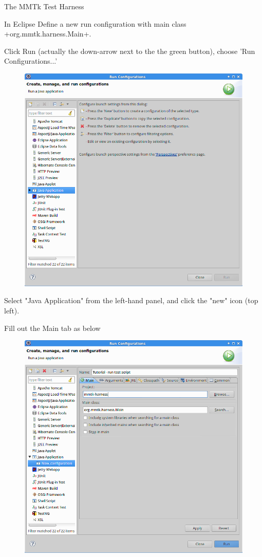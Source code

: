 \begin{chapter}{The MMTk Test Harness}
\begin{section}{In Eclipse}
Define a new run configuration with main class \spverb+org.mmtk.harness.Main+.

Click Run (actually the down-arrow next to the the green button), choose 'Run Configurations...' 
\begin{figure}[H]
  \centering
  \includegraphics[width=\textwidth]{images/TheMMTkTestHarness-RunConfigurations.png}
\end{figure}

Select "Java Application" from the left-hand panel, and click the "new" icon (top left).

Fill out the Main tab as below

\begin{figure}[H]
  \centering
  \includegraphics[width=\textwidth]{images/TheMMTkTestHarness-MainTab.png}
\end{figure}


\end{section}
\end{chapter}
